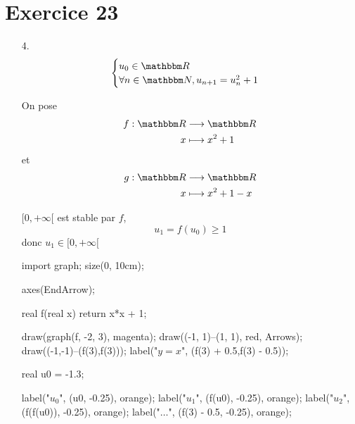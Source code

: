 \part{Exercice 23}

\begin{enumerate}
	\item[4.]
		\[
			\begin{cases}
				u_0 \in \R\\
				\forall n \in \N, u_{n+1} = u_n^2 + 1
			\end{cases}
		\]

		On pose \begin{align*}
			f: \R &\longrightarrow \R \\
			x &\longmapsto x^2 + 1
		\end{align*} et \begin{align*}
			g: \R &\longrightarrow \R \\
			x &\longmapsto x^2 + 1 - x
		\end{align*}

		\begin{center}
		\end{center}

		\begin{center}
		\end{center}
		
		$[0,+\infty[$ est stable par $f$, \[
			u_1 = f(u_0) \ge 1
		\] donc $u_1 \in [0, +\infty[$

		\begin{center}
			\begin{asy}
				import graph;
				size(0, 10cm);

				axes(EndArrow);
				
				real f(real x) {return x*x + 1;}

				draw(graph(f, -2, 3), magenta);
				draw((-1, 1)--(1, 1), red, Arrows);
				draw((-1,-1)--(f(3),f(3)));
				label("$y=x$", (f(3) + 0.5,f(3) - 0.5));

				real u0 = -1.3;

				label("$u_0$", (u0, -0.25), orange);
				label("$u_1$", (f(u0), -0.25), orange);
				label("$u_2$", (f(f(u0)), -0.25), orange);
				label("$\ldots$", (f(3) - 0.5, -0.25), orange);


\end{asy}
\end{center}
\end{enumerate}
